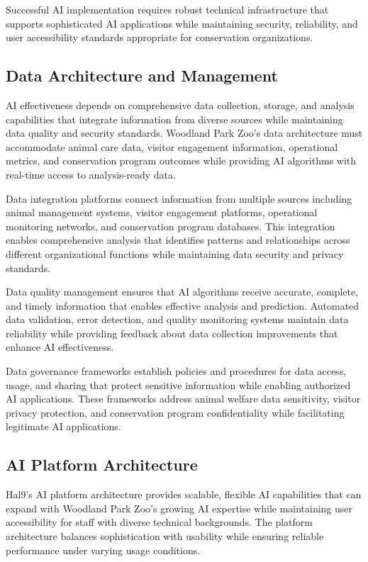 \documentclass[
  Letterpaper,
]{scrbook}
\begin{document}
Successful AI implementation requires robust technical infrastructure
that supports sophisticated AI applications while maintaining security,
reliability, and user accessibility standards appropriate for
conservation organizations.

\subsection{Data Architecture and
Management}\label{data-architecture-and-management}

AI effectiveness depends on comprehensive data collection, storage, and
analysis capabilities that integrate information from diverse sources
while maintaining data quality and security standards. Woodland Park
Zoo's data architecture must accommodate animal care data, visitor
engagement information, operational metrics, and conservation program
outcomes while providing AI algorithms with real-time access to
analysis-ready data.

Data integration platforms connect information from multiple sources
including animal management systems, visitor engagement platforms,
operational monitoring networks, and conservation program databases.
This integration enables comprehensive analysis that identifies patterns
and relationships across different organizational functions while
maintaining data security and privacy standards.

Data quality management ensures that AI algorithms receive accurate,
complete, and timely information that enables effective analysis and
prediction. Automated data validation, error detection, and quality
monitoring systems maintain data reliability while providing feedback
about data collection improvements that enhance AI effectiveness.

Data governance frameworks establish policies and procedures for data
access, usage, and sharing that protect sensitive information while
enabling authorized AI applications. These frameworks address animal
welfare data sensitivity, visitor privacy protection, and conservation
program confidentiality while facilitating legitimate AI applications.

\subsection{AI Platform Architecture}\label{ai-platform-architecture}

Hal9's AI platform architecture provides scalable, flexible AI
capabilities that can expand with Woodland Park Zoo's growing AI
expertise while maintaining user accessibility for staff with diverse
technical backgrounds. The platform architecture balances sophistication
with usability while ensuring reliable performance under varying usage
conditions.
\end{document}
